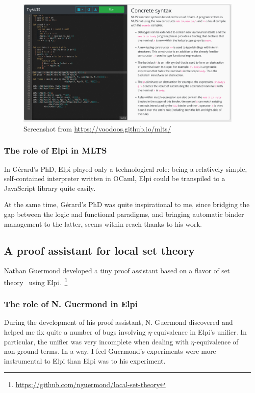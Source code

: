 \documentclass[a4paper, 11pt]{book}
\begin{document}
\begin{figure}
    \includegraphics[width=.9\textwidth]{MLTS}
    \caption{Screenshot from \url{https://voodoos.github.io/mlts/}\label{fig:mlts}}
\end{figure}

\subsubsection{The role of Elpi in MLTS}

In G\'{e}rard's PhD, Elpi played only a technological role: being a
relatively simple, self-contained interpreter written in OCaml, Elpi could be
transpiled to a JavaScript library quite easily.

At the same time, G\'{e}rard's PhD was quite inspirational to me, since
bridging the gap between the logic and functional paradigms, and bringing
automatic binder management to the latter, seems within reach thanks to his
work.


\subsection{A proof assistant for local set theory}

Nathan Guermond developed a tiny proof assistant based on a flavor of set
theory~\cite{https://doi.org/10.1112/blms/22.1.101} using
Elpi.~\footnote{\url{https://github.com/nguermond/local-set-theory}}


\subsubsection{The role of N. Guermond in Elpi}

During the development of his proof assistant, N. Guermond discovered and
helped me fix quite a number of bugs involving $\eta$-equivalence in Elpi's
unifier. In particular, the unifier was very incomplete when dealing with
$\eta$-equivalence of non-ground terms. In a way, I feel Guermond's
experiments were more instrumental to Elpi than Elpi was to his experiment.
\end{document}
